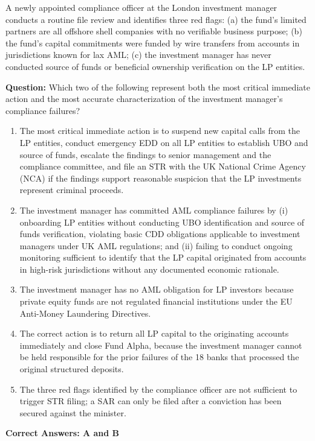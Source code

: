 \documentclass[11pt,a4paper]{article}
\begin{document}
	A newly appointed compliance officer at the London investment manager conducts a routine file review and identifies three red flags: (a) the fund's limited partners are all offshore shell companies with no verifiable business purpose; (b) the fund's capital commitments were funded by wire transfers from accounts in jurisdictions known for lax AML; (c) the investment manager has never conducted source of funds or beneficial ownership verification on the LP entities.
	
	\textbf{Question:} Which two of the following represent both the most critical immediate action and the most accurate characterization of the investment manager's compliance failures?
	
	\begin{enumerate}[label=\Alph*.]
		\item The most critical immediate action is to suspend new capital calls from the LP entities, conduct emergency EDD on all LP entities to establish UBO and source of funds, escalate the findings to senior management and the compliance committee, and file an STR with the UK National Crime Agency (NCA) if the findings support reasonable suspicion that the LP investments represent criminal proceeds.
		\item The investment manager has committed AML compliance failures by (i) onboarding LP entities without conducting UBO identification and source of funds verification, violating basic CDD obligations applicable to investment managers under UK AML regulations; and (ii) failing to conduct ongoing monitoring sufficient to identify that the LP capital originated from accounts in high-risk jurisdictions without any documented economic rationale.
		\item The investment manager has no AML obligation for LP investors because private equity funds are not regulated financial institutions under the EU Anti-Money Laundering Directives.
		\item The correct action is to return all LP capital to the originating accounts immediately and close Fund Alpha, because the investment manager cannot be held responsible for the prior failures of the 18 banks that processed the original structured deposits.
		\item The three red flags identified by the compliance officer are not sufficient to trigger STR filing; a SAR can only be filed after a conviction has been secured against the minister.
	\end{enumerate}
	\textbf{Correct Answers: A and B}
	
\end{document}
